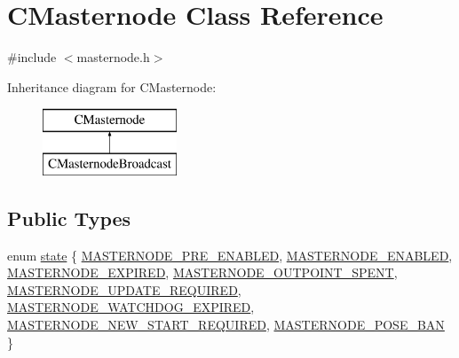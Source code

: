 \hypertarget{class_c_masternode}{}\section{C\+Masternode Class Reference}
\label{class_c_masternode}


{\ttfamily \#include $<$masternode.\+h$>$}

Inheritance diagram for C\+Masternode\+:\begin{figure}[H]
\begin{center}
\leavevmode
\includegraphics[height=2.000000cm]{class_c_masternode}
\end{center}
\end{figure}
\subsection*{Public Types}
\begin{DoxyCompactItemize}
\item 
enum \mbox{\hyperlink{class_c_masternode_a958e9e8587729e417d1a529c81bf2eb0}{state}} \{ \newline
\mbox{\hyperlink{class_c_masternode_a958e9e8587729e417d1a529c81bf2eb0adde1d71baaca5fa61feeaae92d551cdc}{M\+A\+S\+T\+E\+R\+N\+O\+D\+E\+\_\+\+P\+R\+E\+\_\+\+E\+N\+A\+B\+L\+ED}}, 
\mbox{\hyperlink{class_c_masternode_a958e9e8587729e417d1a529c81bf2eb0a479f2643df0b7f7e70c9389ec4b42923}{M\+A\+S\+T\+E\+R\+N\+O\+D\+E\+\_\+\+E\+N\+A\+B\+L\+ED}}, 
\mbox{\hyperlink{class_c_masternode_a958e9e8587729e417d1a529c81bf2eb0aaa88be848b79bb399e3538c452d7fd87}{M\+A\+S\+T\+E\+R\+N\+O\+D\+E\+\_\+\+E\+X\+P\+I\+R\+ED}}, 
\mbox{\hyperlink{class_c_masternode_a958e9e8587729e417d1a529c81bf2eb0af148b4257f0c54f510c41e91ce4bfc86}{M\+A\+S\+T\+E\+R\+N\+O\+D\+E\+\_\+\+O\+U\+T\+P\+O\+I\+N\+T\+\_\+\+S\+P\+E\+NT}}, 
\newline
\mbox{\hyperlink{class_c_masternode_a958e9e8587729e417d1a529c81bf2eb0a401280591a2cec57f97c76fb5e53c049}{M\+A\+S\+T\+E\+R\+N\+O\+D\+E\+\_\+\+U\+P\+D\+A\+T\+E\+\_\+\+R\+E\+Q\+U\+I\+R\+ED}}, 
\mbox{\hyperlink{class_c_masternode_a958e9e8587729e417d1a529c81bf2eb0ae8a2f54cef8d465971f930e26ad0cbbb}{M\+A\+S\+T\+E\+R\+N\+O\+D\+E\+\_\+\+W\+A\+T\+C\+H\+D\+O\+G\+\_\+\+E\+X\+P\+I\+R\+ED}}, 
\mbox{\hyperlink{class_c_masternode_a958e9e8587729e417d1a529c81bf2eb0a4e4ec255452c84058752500b7d5096da}{M\+A\+S\+T\+E\+R\+N\+O\+D\+E\+\_\+\+N\+E\+W\+\_\+\+S\+T\+A\+R\+T\+\_\+\+R\+E\+Q\+U\+I\+R\+ED}}, 
\mbox{\hyperlink{class_c_masternode_a958e9e8587729e417d1a529c81bf2eb0ac9f064d96812c163750fee8d1de26d74}{M\+A\+S\+T\+E\+R\+N\+O\+D\+E\+\_\+\+P\+O\+S\+E\+\_\+\+B\+AN}}
 \}
\end{DoxyCompactItemize}
